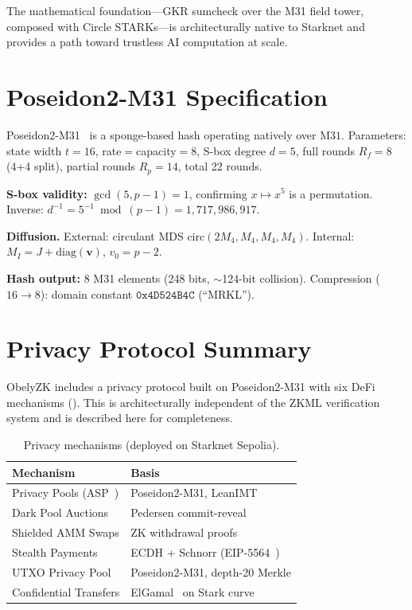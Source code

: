 \documentclass[10pt,twocolumn]{article}
\theoremstyle{definition}
\theoremstyle{remark}
\newcommand{\M}{\mathrm{M31}}
\begin{document}
The mathematical foundation---GKR sumcheck over the M31 field tower,
composed with Circle STARKs---is architecturally native to Starknet
and provides a path toward trustless AI computation at scale.


\appendix

\section{Poseidon2-M31 Specification}\label{app:poseidon}

Poseidon2-M31~\cite{grassi2023poseidon2} is a sponge-based hash
operating natively over $\M$.
Parameters: state width $t=16$, rate$=$capacity$=8$,
S-box degree $d=5$, full rounds $R_f=8$ (4+4 split),
partial rounds $R_p=14$, total 22 rounds.

\textbf{S-box validity:} $\gcd(5,p-1) = 1$, confirming $x\mapsto x^5$
is a permutation.
Inverse: $d^{-1} = 5^{-1}\bmod(p-1) = 1{,}717{,}986{,}917$.

\textbf{Diffusion.}
External: circulant MDS $\text{circ}(2M_4, M_4, M_4, M_4)$.
Internal: $M_I = J + \text{diag}(\mathbf{v})$, $v_0 = p-2$.

\textbf{Hash output:} 8 M31 elements (248 bits, $\sim$124-bit collision).
Compression ($16\to 8$): domain constant
$\texttt{0x4D524B4C}$ (``MRKL'').

\section{Privacy Protocol Summary}\label{app:privacy}

ObelyZK includes a privacy protocol built on Poseidon2-M31 with
six DeFi mechanisms ().
This is architecturally independent of the ZKML verification system
and is described here for completeness.

\begin{table}[h]
  \centering\small
  \caption{Privacy mechanisms (deployed on Starknet Sepolia).}
  \label{tab:privacy}
  \begin{tabularx}{\columnwidth}{@{}lX@{}}
    \toprule
    \textbf{Mechanism} & \textbf{Basis} \\
    \midrule
    Privacy Pools (ASP~\cite{buterin2023privacy})
      & Poseidon2-M31, LeanIMT \\
    Dark Pool Auctions
      & Pedersen commit-reveal \\
    Shielded AMM Swaps
      & ZK withdrawal proofs \\
    Stealth Payments
      & ECDH + Schnorr (EIP-5564~\cite{eip5564}) \\
    UTXO Privacy Pool
      & Poseidon2-M31, depth-20 Merkle \\
    Confidential Transfers
      & ElGamal~\cite{elgamal1985} on Stark curve \\
    \bottomrule
  \end{tabularx}
\end{table}
\end{document}
